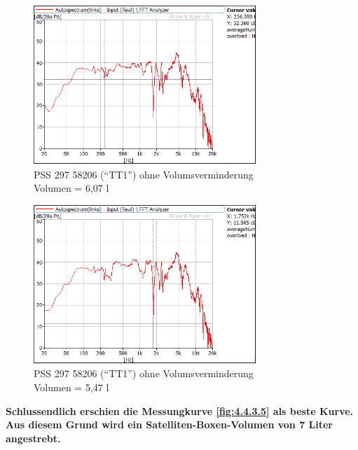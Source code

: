 \begin{figure} [H]
	\centering
	\includegraphics[width=0.75\textwidth]{img/Optimierung/TT/TT1_Styro_6-07l.png}
	\caption{PSS 297 58206 (\enquote{TT1}) ohne Volumsverminderung \\Volumen = 6,07 l}
	\label{fig:4.4.3.6}
\end{figure}

\begin{figure} [H]
	\centering
	\includegraphics[width=0.75\textwidth]{img/Optimierung/TT/TT1_Styro_5-47l.png}
	\caption{PSS 297 58206 (\enquote{TT1}) ohne Volumsverminderung \\Volumen = 5,47 l}
	\label{fig:4.4.3.7}
\end{figure}

\textbf{Schlussendlich erschien die Messungkurve \ref{fig:4.4.3.5} als beste Kurve.
Aus diesem Grund wird ein Satelliten-Boxen-Volumen von 7 Liter angestrebt.}

